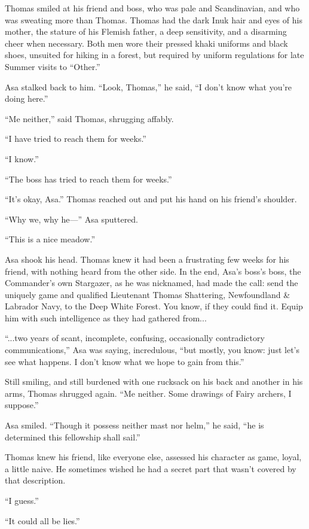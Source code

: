 \documentclass[11pt,a5paper]{article}
\begin{document}
Thomas smiled at his friend and boss, who was pale and Scandinavian, and who was sweating more than Thomas. Thomas had the dark Inuk hair and eyes of his mother, the stature of his Flemish father, a deep sensitivity, and a disarming cheer when necessary. Both men wore their pressed khaki uniforms and black shoes, unsuited for hiking in a forest, but required by uniform regulations for late Summer visits to ``Other.''

Asa stalked back to him. ``Look, Thomas,'' he said, ``I don't know what you're doing here.''

``Me neither,'' said Thomas, shrugging affably.

``I have tried to reach them for weeks.''

``I know.''

``The boss has tried to reach them for weeks.''

``It's okay, Asa.'' Thomas reached out and put his hand on his friend's shoulder.

``Why we, why he---'' Asa sputtered.

``This is a nice meadow.''

Asa shook his head. Thomas knew it had been a frustrating few weeks for his friend, with nothing heard from the other side. In the end, Asa's boss's boss, the Commander's own Stargazer, as he was nicknamed, had made the call: send the uniquely game and qualified Lieutenant Thomas Shattering, Newfoundland \& Labrador Navy, to the Deep White Forest. You know, if they could find it. Equip him with such intelligence as they had gathered from...

``...two years of scant, incomplete, confusing, occasionally contradictory communications,'' Asa was saying, incredulous, ``but mostly, you know: just let's see what happens. I don't know what we hope to gain from this.''

Still smiling, and still burdened with one rucksack on his back and another in his arms, Thomas shrugged again. ``Me neither. Some drawings of Fairy archers, I suppose.''

Asa smiled. ``Though it possess neither mast nor helm,'' he said, ``he is determined this fellowship shall sail.''

Thomas knew his friend, like everyone else, assessed his character as game, loyal, a little naive. He sometimes wished he had a secret part that wasn't covered by that description.

``I guess.''

``It could all be lies.''
\end{document}
